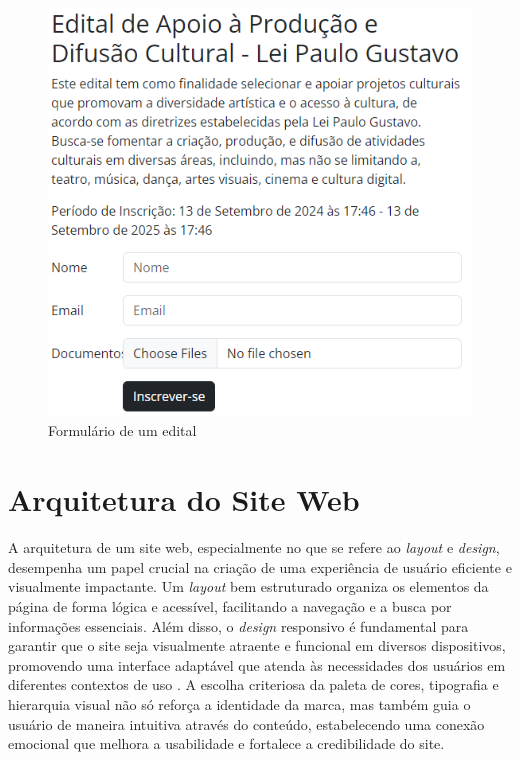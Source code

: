 \begin{figure}[htb]
	\caption{\label{fig_grafico}Formulário de um edital}
	\begin{center}
	    \includegraphics[scale=0.3]{./img/form_edital.png}
	\end{center}
\end{figure}

\section{Arquitetura do Site Web}

A arquitetura de um site web, especialmente no que se refere ao \textit{layout} e \textit{design}, desempenha um papel crucial na criação de uma experiência de usuário eficiente e visualmente impactante. Um \textit{layout} bem estruturado organiza os elementos da página de forma lógica e acessível, facilitando a navegação e a busca por informações essenciais. Além disso, o \textit{design} responsivo é fundamental para garantir que o site seja visualmente atraente e funcional em diversos dispositivos, promovendo uma interface adaptável que atenda às necessidades dos usuários em diferentes contextos de uso \cite{garrett2010elements}. A escolha criteriosa da paleta de cores, tipografia e hierarquia visual não só reforça a identidade da marca, mas também guia o usuário de maneira intuitiva através do conteúdo, estabelecendo uma conexão emocional que melhora a usabilidade e fortalece a credibilidade do site.

